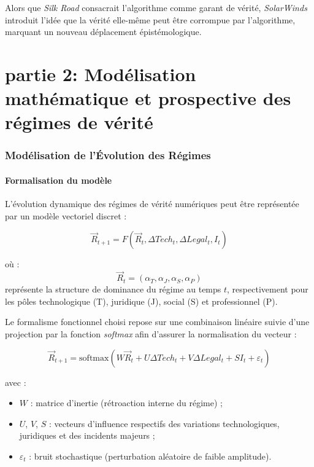 \documentclass[12pt, a4em]{article}
\begin{document}
	Alors que \textit{Silk Road} consacrait l’algorithme comme garant de vérité, \textit{SolarWinds} introduit l’idée que la vérité elle-même peut être corrompue par l’algorithme, marquant un nouveau déplacement épistémologique.
	
	
	
	
	
	\part*{partie 2: Modélisation mathématique et prospective des régimes de vérité}
	
	\section{ Modélisation de l’Évolution des Régimes}
	\subsection{ Formalisation du modèle}
	
	L’évolution dynamique des régimes de vérité numériques peut être représentée par un modèle vectoriel discret :
	
	\[
	\vec{R}_{t+1} = F(\vec{R}_t, \Delta Tech_t, \Delta Legal_t, I_t)
	\]
	
	où :
	\[
	\vec{R}_t = (\alpha_T, \alpha_J, \alpha_S, \alpha_P)
	\]
	représente la structure de dominance du régime au temps $t$, respectivement pour les pôles technologique (T), juridique (J), social (S) et professionnel (P).
	
	Le formalisme fonctionnel choisi repose sur une combinaison linéaire suivie d’une projection par la fonction \textit{softmax} afin d’assurer la normalisation du vecteur :
	
	\[
	\vec{R}_{t+1} = \mathrm{softmax}(W\vec{R}_t + U\Delta Tech_t + V\Delta Legal_t + S I_t + \varepsilon_t)
	\]
	
	avec :
	\begin{itemize}
		\item $W$ : matrice d’inertie (rétroaction interne du régime) ;
		\item $U$, $V$, $S$ : vecteurs d’influence respectifs des variations technologiques, juridiques et des incidents majeurs ;
		\item $\varepsilon_t$ : bruit stochastique (perturbation aléatoire de faible amplitude).
	\end{itemize}
	
\end{document}
